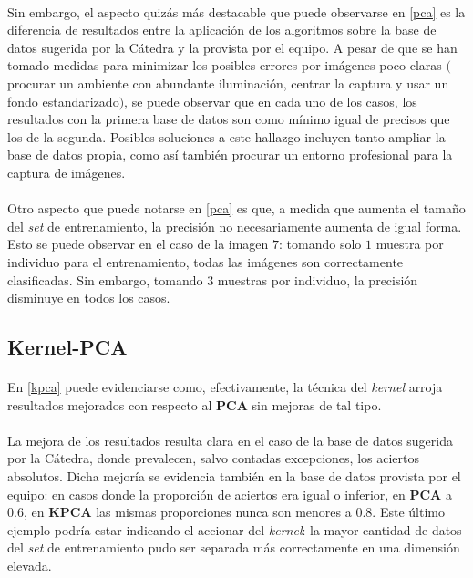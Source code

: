 \documentclass[12pt, twocolumn]{article}
\begin{document}
	\paragraph{} Sin embargo, el aspecto quizás más destacable que puede observarse en \ref{pca} es la diferencia de resultados entre la aplicación de los algoritmos sobre la base de datos sugerida por la Cátedra y la provista por el equipo. A pesar de que se han tomado medidas para minimizar los posibles errores por imágenes poco claras $($procurar un ambiente con abundante iluminación, centrar la captura y usar un fondo estandarizado$)$, se puede observar que en cada uno de los casos, los resultados con la primera base de datos son como mínimo igual de precisos que los de la segunda. Posibles soluciones a este hallazgo incluyen tanto ampliar la base de datos propia, como así también procurar un entorno profesional para la captura de imágenes.  
	
	\paragraph{} Otro aspecto que puede notarse en \ref{pca} es que, a medida que aumenta el tamaño del \textit{set} de entrenamiento, la precisión no necesariamente aumenta de igual forma. Esto se puede observar en el caso de la imagen $7$: tomando solo $1$ muestra por individuo para el entrenamiento, todas las imágenes son correctamente clasificadas. Sin embargo, tomando $3$ muestras por individuo, la precisión disminuye en todos los casos.
		
	\subsection{Kernel-PCA}
	
	\paragraph{} En \ref{kpca} puede evidenciarse como, efectivamente, la técnica del \textit{kernel} arroja resultados mejorados con respecto al \textbf{PCA} sin mejoras de tal tipo. 
	
	\paragraph{} La mejora de los resultados resulta clara en el caso de la base de datos sugerida por la Cátedra, donde prevalecen, salvo contadas excepciones, los aciertos absolutos. Dicha mejoría se evidencia también en la base de datos provista por el equipo: en casos donde la proporción de aciertos era igual o inferior, en \textbf{PCA} a $0.6$, en \textbf{KPCA} las mismas proporciones nunca son menores a $0.8$. Este último ejemplo podría estar indicando el accionar del \textit{kernel}: la mayor cantidad de datos del \textit{set} de entrenamiento pudo ser separada más correctamente en una dimensión elevada.
	
\end{document}
